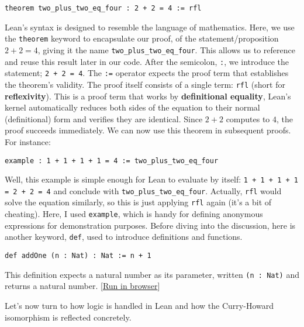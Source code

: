 \begin{example}\mbox{}

  \begin{lstlisting}[language=Lean]
    theorem two_plus_two_eq_four : 2 + 2 = 4 := rfl
\end{lstlisting}
  Lean's syntax is designed to resemble the language of mathematics.
  Here, we use the \lstinline[language=lean]|theorem| keyword to encapsulate our proof,
  of the statement/proposition $2 + 2 = 4$,
  giving it the name \lstinline[language=lean]|two_plus_two_eq_four|.
  This allows us to reference and reuse this result later in our code.
  After the semicolon, \lstinline[language=lean]|:|, we introduce the
  statement; \lstinline[language=lean]|2 + 2 = 4|.
  The \lstinline[language=lean]|:=| operator expects the
  proof term that establishes the theorem's validity.
  The proof itself consists of a single term: \lstinline[language=lean]|rfl|
  (short for \textbf{reflexivity}). This is a proof term that works by
  \textbf{definitional equality}, Lean's kernel automatically reduces both sides of the equation
  to their normal (definitional) form and verifies they are identical.
  Since $2 + 2$ computes to $4$, the proof succeeds immediately.
  We can now use this theorem in subsequent proofs. For instance:
  \begin{lstlisting}[language=Lean]
    example : 1 + 1 + 1 + 1 = 4 := two_plus_two_eq_four
\end{lstlisting}
  Well, this example is simple enough for Lean to evaluate by itself:
  \lstinline[language=lean]|1 + 1 + 1 + 1 = 2 + 2 = 4|
  and conclude with \lstinline[language=lean]|two_plus_two_eq_four|.
  Actually, \lstinline[language=lean]|rfl| would solve the equation similarly,
  so this is just applying \lstinline[language=lean]|rfl| again (it's a bit of cheating).
  Here, I used \lstinline[language=lean]|example|, which is handy for defining anonymous
  expressions for demonstration purposes.
  Before diving into the discussion, here is another keyword, \lstinline[language=lean]|def|,
  used to introduce definitions and functions.

  \begin{lstlisting}[language=Lean]
    def addOne (n : Nat) : Nat := n + 1
\end{lstlisting}
  This definition expects a natural number as its parameter, written \lstinline[language=lean]|(n : Nat)|
  and returns a natural number.
    [\href{https://live.lean-lang.org/\#codez=YOUR_ENCODED_URL_HERE}{Run in browser}]
\end{example}
Let's now turn to how logic is handled in Lean and how the Curry-Howard
isomorphism is reflected concretely.


